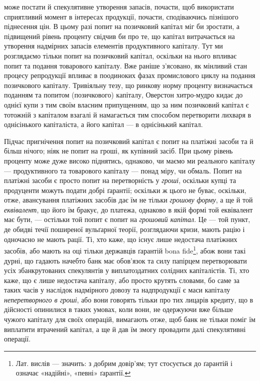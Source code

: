 \parcont{}  %
може постати й спекулятивне утворення запасів, почасти, щоб використати сприятливий
момент в інтересах продукції, почасти, сподіваючись пізнішого піднесення
цін. В цьому разі попит на позичковий капітал міг би зростати, а підвищений
рівень проценту свідчив би про те, що капітал витрачається на утворення
надмірних запасів елементів продуктивного капіталу. Тут ми розглядаємо
тільки попит на позичковий капітал, оскільки на нього впливає попит та
подання товарового капіталу. Вже раніше з’ясовано, як мінливий стан процесу
репродукції впливає в поодиноких фазах промислового циклу на подання позичкового
капіталу. Тривіяльну тезу, що ринкову норму проценту визначається
поданням та попитом (позичкового) капіталу, Оверстон хитро-мудро кидає до
однієї купи з тим своїм власним припущенням, що за ним позичковий капітал
є тотожній з капіталом взагалі й намагається тим способом перетворити лихваря
в однісінького капіталіста, а його капітал — в однісінький капітал.

Підчас пригнічення попит на позичковий капітал є попит на платіжні засоби
та й більш нічого; ніяк не попит на гроші, як купівний засіб. При цьому
рівень проценту може дуже високо піднятись, однаково, чи маємо ми реального
капіталу — продуктивного та товарового капіталу — понад міру, чи обмаль.
Попит на платіжні засоби є просто попит на перетворність у \emph{гроші}, оскільки
купці та продуценти можуть подати добрі ґарантії; оскільки ж цього не буває,
оскільки, отже, авансування платіжних засобів дає їм не тільки \emph{грошову}
\emph{форму}, а ще й той \emph{еквівалент}, що його їм бракує, до платежа, однаково в якій
формі той еквівалент має бути, — остільки той попит є попит на \emph{грошовий капітал}.
Це — той пункт, де обидві течії поширеної вульґарної теорії, розглядаючи
кризи, мають рацію і одночасно не мають рації. Ті, хто каже, що існує лише недостача
платіжних засобів, або мають на оці тільки державців ґарантій bona
fide\footnote{
Лат. вислів — значить: з добрим довір’ям; тут стосується до ґарантій і означає
«надійні», «певні» ґарантії. 
}, абож вони такі дурні, що гадають начебто банк має обов’язок та силу
папірцем перетворювати усіх збанкрутованих спекулянтів у виплатоздатних солідних
капіталістів. Ті, хто каже, що є лише недостача капіталу, або просто
крутять словами, бо саме за таких часів у наслідок надмірного довозу та надпродукції
є маси капіталу \emph{неперетворного в гроші}, або вони говорять тільки
про тих лицарів кредиту, що в дійсності опинилися в таких умовах, коли вони,
не одержуючи вже більше чужого капіталу для своїх операцій, вимагають
отже, щоб банк не тільки поміг їм виплатити втрачений капітал, а ще й дав
їм змогу провадити далі спекулятивні операції.

